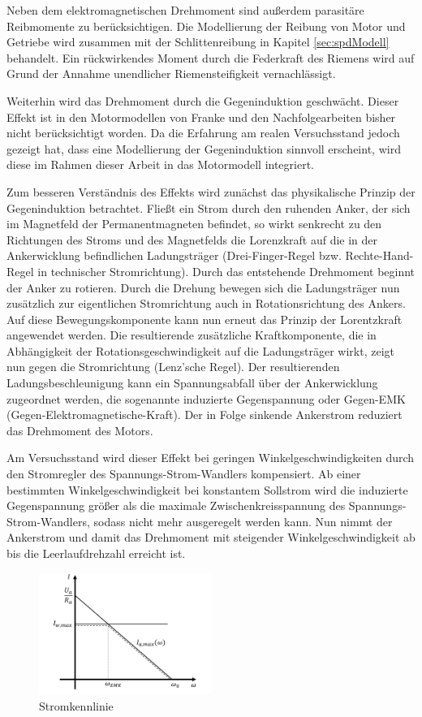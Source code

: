 Neben dem elektromagnetischen Drehmoment sind außerdem parasitäre Reibmomente zu berücksichtigen. Die Modellierung der Reibung von Motor und Getriebe wird zusammen mit der Schlittenreibung in Kapitel \ref{sec:spdModell} behandelt. Ein rückwirkendes Moment durch die Federkraft des Riemens wird auf Grund der Annahme unendlicher Riemensteifigkeit vernachlässigt. 

Weiterhin wird das Drehmoment durch die Gegeninduktion geschwächt. Dieser Effekt ist in den Motormodellen von Franke \cite{franke} und den Nachfolgearbeiten bisher nicht berücksichtigt worden. Da die Erfahrung am realen Versuchsstand jedoch gezeigt hat, dass eine Modellierung der Gegeninduktion sinnvoll erscheint, wird diese im Rahmen dieser Arbeit in das Motormodell integriert.

Zum besseren Verständnis des Effekts wird zunächst das physikalische Prinzip der Gegeninduktion betrachtet. Fließt ein Strom durch den ruhenden Anker, der sich im Magnetfeld der Permanentmagneten befindet, so wirkt senkrecht zu den Richtungen des Stroms und des Magnetfelds die Lorenzkraft auf die in der Ankerwicklung befindlichen Ladungsträger (Drei-Finger-Regel bzw. Rechte-Hand-Regel in technischer Stromrichtung). Durch das entstehende Drehmoment beginnt der Anker zu rotieren. Durch die Drehung bewegen sich die Ladungsträger nun zusätzlich zur eigentlichen Stromrichtung auch in Rotationsrichtung des Ankers. Auf diese Bewegungskomponente kann nun erneut das Prinzip der Lorentzkraft angewendet werden. Die resultierende zusätzliche Kraftkomponente, die in Abhängigkeit der Rotationsgeschwindigkeit auf die Ladungsträger wirkt, zeigt nun gegen die Stromrichtung (Lenz'sche Regel). Der resultierenden Ladungsbeschleunigung kann ein Spannungsabfall über der Ankerwicklung zugeordnet werden, die sogenannte induzierte Gegenspannung oder Gegen-EMK (Gegen-Elektromagnetische-Kraft). Der in Folge sinkende Ankerstrom reduziert das Drehmoment des Motors. \cite{binder}

Am Versuchsstand wird dieser Effekt bei geringen Winkelgeschwindigkeiten durch den Stromregler des Spannungs-Strom-Wandlers kompensiert. Ab einer bestimmten Winkelgeschwindigkeit bei konstantem Sollstrom wird die induzierte Gegenspannung größer als die maximale Zwischenkreisspannung des Spannungs-Strom-Wandlers, sodass nicht mehr ausgeregelt werden kann. Nun nimmt der Ankerstrom und damit das Drehmoment mit steigender Winkelgeschwindigkeit ab bis die Leerlaufdrehzahl erreicht ist. 

\begin{figure}[htbp]
	\centering
		\includegraphics[width=0.50\textwidth]{Bilder/Motor/Stromkennlinie.pdf}
	\caption{Stromkennlinie}
	\label{fig:Stromkennlinie}
\end{figure}

